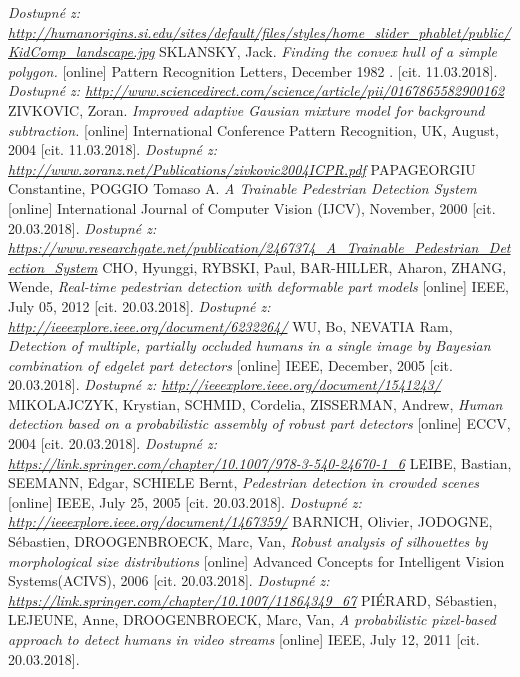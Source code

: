 \begin{thebibliography}{99}
	 \textit{Dostupné z: \url{http://humanorigins.si.edu/sites/default/files/styles/home_slider_phablet/public/KidComp_landscape.jpg}}
	SKLANSKY, Jack. \textit{Finding the convex hull of a simple polygon.} [online] Pattern Recognition Letters, December 1982 . [cit. 11.03.2018].
		\textit{Dostupné z: \url{http://www.sciencedirect.com/science/article/pii/0167865582900162}}
	ZIVKOVIC, Zoran. \textit{Improved adaptive Gausian mixture model for background subtraction.} [online] International Conference Pattern Recognition, UK, August, 2004 [cit. 11.03.2018].
		\textit{Dostupné z: \url{http://www.zoranz.net/Publications/zivkovic2004ICPR.pdf}}
	 PAPAGEORGIU Constantine, POGGIO Tomaso A. \textit{A Trainable Pedestrian Detection System} [online] International Journal of Computer Vision (IJCV), November, 2000  [cit. 20.03.2018]. 
 		\textit{Dostupné z: \url{https://www.researchgate.net/publication/2467374_A_Trainable_Pedestrian_Detection_System}}
 	 CHO, Hyunggi, RYBSKI, Paul, BAR-HILLER, Aharon, ZHANG, Wende,  \textit{Real-time pedestrian detection with deformable part models} [online] IEEE, July 05, 2012  [cit. 20.03.2018]. 
 		\textit{Dostupné z: \url{http://ieeexplore.ieee.org/document/6232264/}}
 	 WU, Bo, NEVATIA Ram, \textit{Detection of multiple, partially occluded humans in a single image by Bayesian combination of edgelet part detectors} [online] IEEE, December, 2005 [cit. 20.03.2018]. 
 		\textit{Dostupné z: \url{http://ieeexplore.ieee.org/document/1541243/}}
 	 MIKOLAJCZYK, Krystian, SCHMID, Cordelia, ZISSERMAN, Andrew, \textit{Human detection based on a probabilistic assembly of robust part detectors} [online] ECCV, 2004 [cit. 20.03.2018]. 
 		\textit{Dostupné z: \url{https://link.springer.com/chapter/10.1007/978-3-540-24670-1_6}}
 	 LEIBE, Bastian, SEEMANN, Edgar, SCHIELE Bernt, \textit{Pedestrian detection in crowded scenes} [online] IEEE, July 25, 2005 [cit. 20.03.2018]. 
 		\textit{Dostupné z: \url{http://ieeexplore.ieee.org/document/1467359/}}
 	 BARNICH, Olivier, JODOGNE, Sébastien, DROOGENBROECK, Marc, Van, \textit{Robust analysis of silhouettes by morphological size distributions} [online] Advanced Concepts for Intelligent Vision Systems(ACIVS), 2006 [cit. 20.03.2018]. 
 		\textit{Dostupné z: \url{https://link.springer.com/chapter/10.1007/11864349_67}}
 	 PIÉRARD, Sébastien, LEJEUNE, Anne, DROOGENBROECK, Marc, Van, \textit{A probabilistic pixel-based approach to detect humans in video streams}  [online] IEEE, July 12, 2011  [cit. 20.03.2018]. 

\end{thebibliography}
